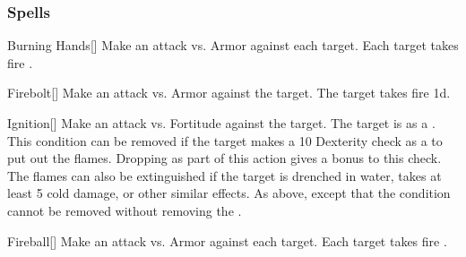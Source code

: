 \subsubsection{Spells}


\lowercase{\hypertarget{spell:Burning Hands}{}}\label{spell:Burning Hands}
\begin{freeability}[\nth{1}]{\hypertarget{spell:Burning Hands}{Burning Hands}}[]
Make an attack vs. Armor against each target.
\hit Each target takes fire .
\end{freeability}
\vspace{0.25em}



\lowercase{\hypertarget{spell:Firebolt}{}}\label{spell:Firebolt}
\begin{freeability}[\nth{1}]{\hypertarget{spell:Firebolt}{Firebolt}}[]
Make an attack vs. Armor against the target.
\hit The target takes fire  \plus1d.
\end{freeability}
\vspace{0.25em}



\lowercase{\hypertarget{spell:Ignition}{}}\label{spell:Ignition}
\begin{freeability}[\nth{1}]{\hypertarget{spell:Ignition}{Ignition}}[]
Make an attack vs. Fortitude against the target.
\hit The target is  as a .
This condition can be removed if the target makes a  10 Dexterity check as a  to put out the flames.
Dropping  as part of this action gives a  bonus to this check.
The flames can also be extinguished if the target is drenched in water, takes at least 5 cold damage, or other similar effects.
\crit As above, except that the condition cannot be removed without removing the .
\end{freeability}
\vspace{0.25em}



\lowercase{\hypertarget{spell:Fireball}{}}\label{spell:Fireball}
\begin{freeability}[\nth{2}]{\hypertarget{spell:Fireball}{Fireball}}[]
Make an attack vs. Armor against each target.
\hit Each target takes fire .
\end{freeability}
\vspace{0.25em}



